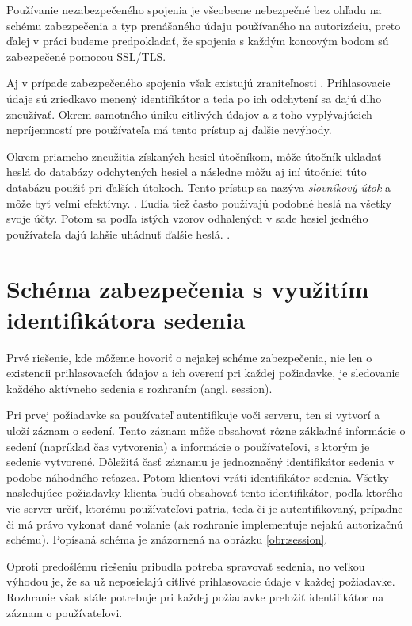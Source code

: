 Používanie nezabezpečeného spojenia je všeobecne nebezpečné bez ohľadu na schému zabezpečenia a typ prenášaného údaju používaného na autorizáciu, preto ďalej v práci budeme predpokladať, že spojenia s každým koncovým bodom sú zabezpečené pomocou SSL/TLS.

Aj v prípade zabezpečeného spojenia však existujú zraniteľnosti \cite{tsl_vulnerabilities}. Prihlasovacie údaje sú zriedkavo menený identifikátor a teda po ich odchytení sa dajú dlho zneužívať. Okrem samotného úniku citlivých údajov a z toho vyplývajúcich nepríjemností pre používateľa má tento prístup aj ďalšie nevýhody.

Okrem priameho zneužitia získaných hesiel útočníkom, môže útočník ukladať heslá do databázy odchytených hesiel a následne môžu aj iní útočníci túto databázu použiť pri ďalších útokoch. Tento prístup sa nazýva \textit{slovníkový útok} a môže byť veľmi efektívny. \cite{fast_dict_attacks}. Ľudia tiež často používajú podobné heslá na všetky svoje účty. Potom sa podľa istých vzorov odhalených v sade hesiel jedného používateľa dajú ľahšie uhádnuť ďalšie heslá. \cite{password_patterns}.


\section{Schéma zabezpečenia s využitím identifikátora sedenia}
\label{sec:session}

Prvé riešenie, kde môžeme hovoriť o nejakej schéme zabezpečenia, nie len o existencii prihlasovacích údajov a ich overení pri každej požiadavke, je sledovanie každého aktívneho sedenia s rozhraním (angl. session).

Pri prvej požiadavke sa používateľ autentifikuje voči serveru, ten si vytvorí a uloží záznam o sedení. Tento záznam môže obsahovať rôzne základné informácie o sedení (napríklad čas vytvorenia) a informácie o používateľovi, s ktorým je sedenie vytvorené. Dôležitá časť záznamu je jednoznačný identifikátor sedenia v podobe náhodného reťazca. Potom klientovi vráti identifikátor sedenia. Všetky nasledujúce požiadavky klienta budú obsahovať tento identifikátor, podľa ktorého vie server určiť, ktorému používateľovi patria, teda či je autentifikovaný, prípadne či má právo vykonať dané volanie (ak rozhranie implementuje nejakú autorizačnú schému). Popísaná schéma je znázornená na obrázku \ref{obr:session}.

Oproti predošlému riešeniu pribudla potreba spravovať sedenia, no veľkou výhodou je, že sa už neposielajú citlivé prihlasovacie údaje v každej požiadavke. Rozhranie však stále potrebuje pri každej požiadavke preložiť identifikátor na záznam o používateľovi.


